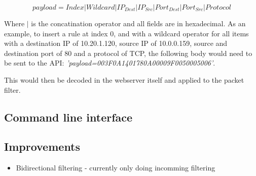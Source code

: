 \[
payload=Index | Wildcard | IP_{Dest} |  IP_{Src}  | Port_{Dest} |  Port_{Src} | Protocol
\]

Where $|$ is the concatination operator and all fields are in hexadecimal. As an example, to insert a rule at index 0, and with a wildcard operator for all items with a destination IP of 10.20.1.120, source IP of 10.0.0.159, source and destination port of 80 and a protocol of TCP, the following body would need to be sent to the API: \textit{'payload=003F0A1401780A00009F0050005006'}.

This would then be decoded in the webserver itself and applied to the packet filter. 




\subsection{Command line interface}


\subsection{Improvements}

\begin{itemize}
    \item Bidirectional filtering - currently only doing incomming filtering
\end{itemize}